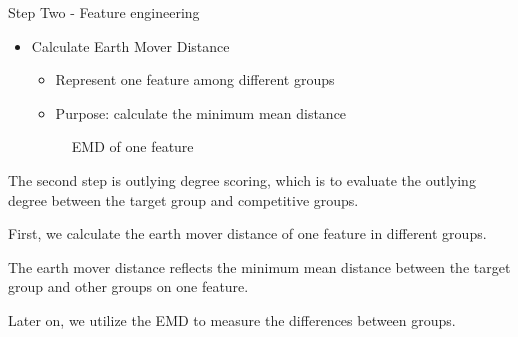 \documentclass[
size=14pt,
paper=smartboard,  %
mode=present, 		%
display=slides, 	%
style=tuliplab,  	%
pauseslide,
fleqn,leqno]{powerdot}
\begin{document}
\begin{slide}{Step Two - Feature engineering}
	\begin{itemize}
		\item
		Calculate Earth Mover Distance
		
		\begin{itemize}
			\item
			Represent one feature among different groups
			
			\item
			Purpose: calculate the minimum mean distance
		\end{itemize}
		
		\begin{figure}
			\caption{EMD of one feature}\label{EMD}
		\end{figure}
	\end{itemize}
	
	\begin{note}
		The second step is outlying degree scoring,
		which is to evaluate the outlying degree between the target group and competitive groups.
		
		First,
		we calculate the earth mover distance of one feature in different groups.
		
		The earth mover distance reflects the minimum mean distance between
		the target group and other groups on one feature.
		
		Later on,
		we utilize the EMD to measure the differences between groups.
	\end{note}
	
\end{slide}
\end{document}
